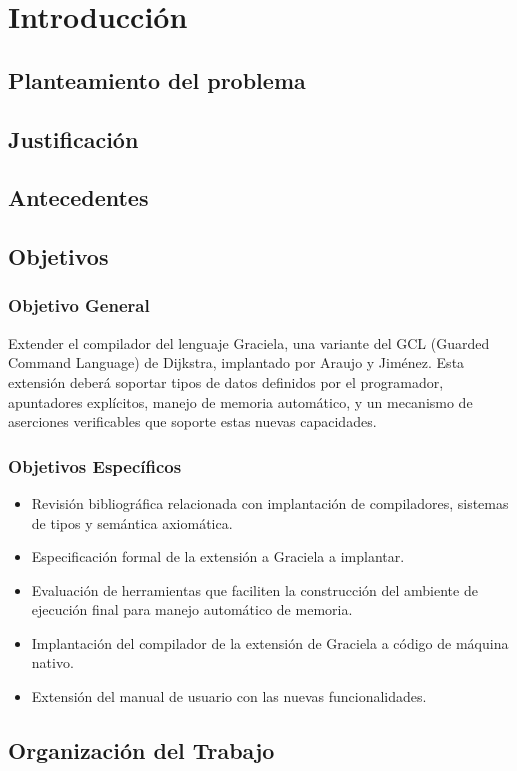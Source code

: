 \chapter*{Introducción}
\label{intro}

\section*{Planteamiento del problema}


\section*{Justificación}


\section*{Antecedentes}


\section*{Objetivos}


\subsection*{Objetivo General}

Extender el compilador del lenguaje Graciela, una variante del GCL (Guarded
Command Language) de Dijkstra, implantado por Araujo y Jiménez. Esta extensión
deberá soportar tipos de datos definidos por el programador, apuntadores
explícitos, manejo de memoria automático, y un mecanismo de aserciones
verificables que soporte estas nuevas capacidades.

\subsection*{Objetivos Específicos}
\begin{itemize}
  \item Revisión bibliográfica relacionada con implantación de compiladores,
  sistemas de tipos y semántica axiomática.

  \item Especificación formal de la extensión a Graciela a implantar.

  \item Evaluación de herramientas que faciliten la construcción del ambiente de
  ejecución final para manejo automático de memoria.

  \item Implantación del compilador de la extensión de Graciela a código de
  máquina nativo.

  \item Extensión del manual de usuario con las nuevas funcionalidades.
\end{itemize}

\section*{Organización del Trabajo}


